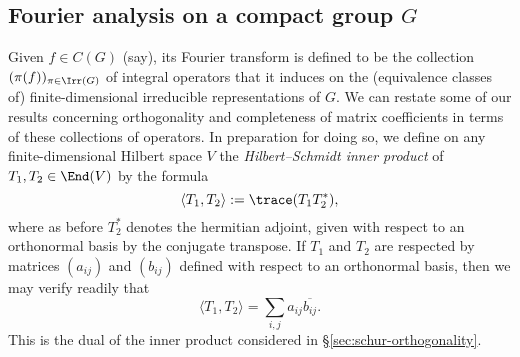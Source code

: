 \documentclass[reqno]{amsart} 
\begin{document}
\subsection{Fourier analysis on a compact group \texorpdfstring{$G$}{G}}\label{sec:four-analys-comp}
Given $f \in C(G)$ (say), its Fourier transform is defined to be the collection $(\pi(f))_{\pi \in \Irr(G)}$ of integral operators that it induces on the (equivalence classes of) finite-dimensional irreducible representations of $G$.  We can restate some of our results concerning orthogonality and completeness of matrix coefficients in terms of these collections of operators.  In preparation for doing so, we define on any finite-dimensional Hilbert space $V$ the \emph{Hilbert--Schmidt inner product} of $T_1, T_2 \in \End(V)$ by the formula
\begin{equation*}
  \langle T_1, T_2 \rangle := \trace(T_1 T_2^*),
\end{equation*}
where as before $T_2^*$ denotes the hermitian adjoint, given with respect to an orthonormal basis by the conjugate transpose.  If $T_1$ and $T_2$ are respected by matrices $(a_{i j})$ and $(b_{ij})$ defined with respect to an orthonormal basis, then we may verify readily that
\begin{equation*}
  \langle T_1, T_2 \rangle = \sum_{i,j} a_{i j} \overline{b_{i j}}.
\end{equation*}
This is the dual of the inner product considered in \S\ref{sec:schur-orthogonality}.
\end{document}
